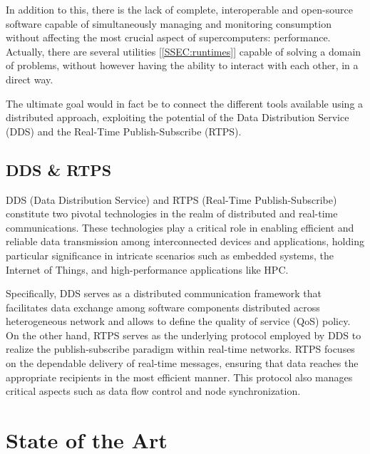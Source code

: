 In addition to this, there is the lack of complete, interoperable and open-source software capable of simultaneously managing and monitoring consumption without affecting the most crucial aspect of supercomputers: performance. Actually, there are several utilities [\ref{SSEC:runtimes}] capable of solving a domain of problems, without however having the ability to interact with each other, in a direct way.

The ultimate goal would in fact be to connect the different tools available using a distributed approach, exploiting the potential of the Data Distribution Service (DDS) and the Real-Time Publish-Subscribe (RTPS).%

\subsection{DDS \& RTPS}\label{SEC:dds}
DDS (Data Distribution Service)\cite{DDS} and RTPS (Real-Time Publish-Subscribe)\cite{RTPS} constitute two pivotal technologies in the realm of distributed and real-time communications. These technologies play a critical role in enabling efficient and reliable data transmission among interconnected devices and applications, holding particular significance in intricate scenarios such as embedded systems, the Internet of Things, and high-performance applications like HPC.

Specifically, DDS serves as a distributed communication framework that facilitates data exchange among software components distributed across heterogeneous network and allows to define the quality of service (QoS) policy. On the other hand, RTPS serves as the underlying protocol employed by DDS to realize the publish-subscribe paradigm within real-time networks. RTPS focuses on the dependable delivery of real-time messages, ensuring that data reaches the appropriate recipients in the most efficient manner. This protocol also manages critical aspects such as data flow control and node synchronization.

\section{State of the Art}\label{SEC:soa}

